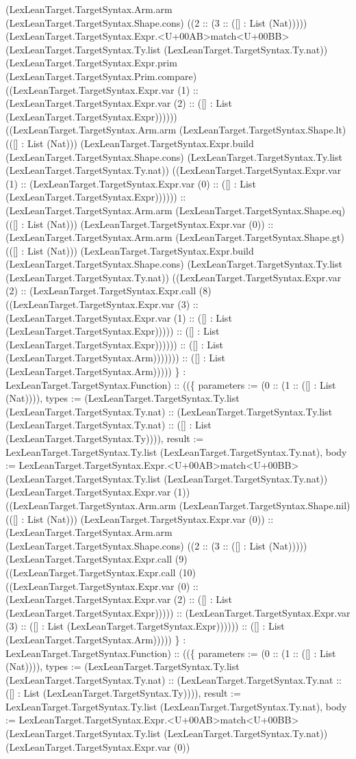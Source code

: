 \documentclass[11pt]{article}
\begin{document}
(LexLeanTarget.TargetSyntax.Arm.arm (LexLeanTarget.TargetSyntax.Shape.cons) ((2 :: (3 :: ([] : List (Nat))))) (LexLeanTarget.TargetSyntax.Expr.<U+00AB>match<U+00BB> (LexLeanTarget.TargetSyntax.Ty.list (LexLeanTarget.TargetSyntax.Ty.nat)) (LexLeanTarget.TargetSyntax.Expr.prim (LexLeanTarget.TargetSyntax.Prim.compare) ((LexLeanTarget.TargetSyntax.Expr.var (1) :: (LexLeanTarget.TargetSyntax.Expr.var (2) :: ([] : List (LexLeanTarget.TargetSyntax.Expr)))))) ((LexLeanTarget.TargetSyntax.Arm.arm (LexLeanTarget.TargetSyntax.Shape.lt) (([] : List (Nat))) (LexLeanTarget.TargetSyntax.Expr.build (LexLeanTarget.TargetSyntax.Shape.cons) (LexLeanTarget.TargetSyntax.Ty.list (LexLeanTarget.TargetSyntax.Ty.nat)) ((LexLeanTarget.TargetSyntax.Expr.var (1) :: (LexLeanTarget.TargetSyntax.Expr.var (0) :: ([] : List (LexLeanTarget.TargetSyntax.Expr)))))) :: (LexLeanTarget.TargetSyntax.Arm.arm (LexLeanTarget.TargetSyntax.Shape.eq) (([] : List (Nat))) (LexLeanTarget.TargetSyntax.Expr.var (0)) :: (LexLeanTarget.TargetSyntax.Arm.arm (LexLeanTarget.TargetSyntax.Shape.gt) (([] : List (Nat))) (LexLeanTarget.TargetSyntax.Expr.build (LexLeanTarget.TargetSyntax.Shape.cons) (LexLeanTarget.TargetSyntax.Ty.list (LexLeanTarget.TargetSyntax.Ty.nat)) ((LexLeanTarget.TargetSyntax.Expr.var (2) :: (LexLeanTarget.TargetSyntax.Expr.call (8) ((LexLeanTarget.TargetSyntax.Expr.var (3) :: (LexLeanTarget.TargetSyntax.Expr.var (1) :: ([] : List (LexLeanTarget.TargetSyntax.Expr))))) :: ([] : List (LexLeanTarget.TargetSyntax.Expr)))))) :: ([] : List (LexLeanTarget.TargetSyntax.Arm))))))) :: ([] : List (LexLeanTarget.TargetSyntax.Arm))))) \} : LexLeanTarget.TargetSyntax.Function) :: ((\{ parameters := (0 :: (1 :: ([] : List (Nat)))), types := (LexLeanTarget.TargetSyntax.Ty.list (LexLeanTarget.TargetSyntax.Ty.nat) :: (LexLeanTarget.TargetSyntax.Ty.list (LexLeanTarget.TargetSyntax.Ty.nat) :: ([] : List (LexLeanTarget.TargetSyntax.Ty)))), result := LexLeanTarget.TargetSyntax.Ty.list (LexLeanTarget.TargetSyntax.Ty.nat), body := LexLeanTarget.TargetSyntax.Expr.<U+00AB>match<U+00BB> (LexLeanTarget.TargetSyntax.Ty.list (LexLeanTarget.TargetSyntax.Ty.nat)) (LexLeanTarget.TargetSyntax.Expr.var (1)) ((LexLeanTarget.TargetSyntax.Arm.arm (LexLeanTarget.TargetSyntax.Shape.nil) (([] : List (Nat))) (LexLeanTarget.TargetSyntax.Expr.var (0)) :: (LexLeanTarget.TargetSyntax.Arm.arm (LexLeanTarget.TargetSyntax.Shape.cons) ((2 :: (3 :: ([] : List (Nat))))) (LexLeanTarget.TargetSyntax.Expr.call (9) ((LexLeanTarget.TargetSyntax.Expr.call (10) ((LexLeanTarget.TargetSyntax.Expr.var (0) :: (LexLeanTarget.TargetSyntax.Expr.var (2) :: ([] : List (LexLeanTarget.TargetSyntax.Expr))))) :: (LexLeanTarget.TargetSyntax.Expr.var (3) :: ([] : List (LexLeanTarget.TargetSyntax.Expr)))))) :: ([] : List (LexLeanTarget.TargetSyntax.Arm))))) \} : LexLeanTarget.TargetSyntax.Function) :: ((\{ parameters := (0 :: (1 :: ([] : List (Nat)))), types := (LexLeanTarget.TargetSyntax.Ty.list (LexLeanTarget.TargetSyntax.Ty.nat) :: (LexLeanTarget.TargetSyntax.Ty.nat :: ([] : List (LexLeanTarget.TargetSyntax.Ty)))), result := LexLeanTarget.TargetSyntax.Ty.list (LexLeanTarget.TargetSyntax.Ty.nat), body := LexLeanTarget.TargetSyntax.Expr.<U+00AB>match<U+00BB> (LexLeanTarget.TargetSyntax.Ty.list (LexLeanTarget.TargetSyntax.Ty.nat)) (LexLeanTarget.TargetSyntax.Expr.var (0)) 
\end{document}
